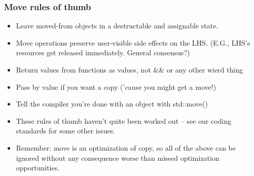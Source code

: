 
\begin{frame}[fragile]
\frametitle{Move rules of thumb}
\begin{itemize}
\item Leave moved-from objects in a destructable and assignable state.
\item Move operations preserve user-visible side effects on the LHS.
  (E.G., LHS's resources get released immediately.  General
  consensus?)
\item Return values from functions as values, not \&\& or any other
  wierd thing
\item Pass by value if you want a copy ('cause you might get a move!)
\item Tell the compiler you're done with an object with std::move()
\item These rules of thumb haven't quite been worked out -- see our
  coding standards for some other issues.
\item Remember: move is an optimization of copy, so all of the above
  can be ignored without any consequence worse than missed
  optimization opportunities.
\end{itemize}

\end{frame}
